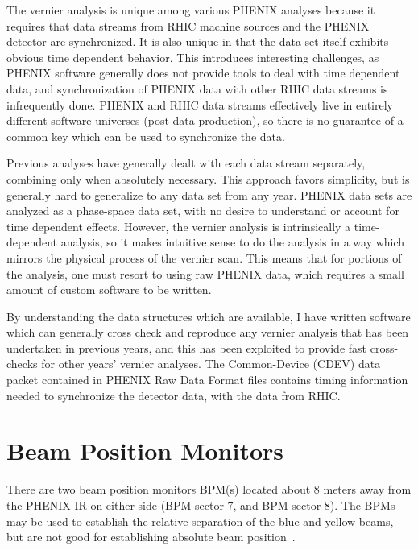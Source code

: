 The vernier analysis is unique among various PHENIX analyses because it requires
that data streams from RHIC machine sources and the PHENIX detector are
synchronized. It is also unique in that the data set itself exhibits obvious time
dependent behavior. This introduces interesting challenges, as PHENIX software
generally does not provide tools to deal with time dependent data, and
synchronization of PHENIX data with other RHIC data streams is infrequently
done. PHENIX and RHIC data streams effectively live in entirely different
software universes (post data production), so there is no guarantee of a common
key which can be used to synchronize the data. 

Previous analyses have generally dealt with each data stream separately,
combining only when absolutely necessary. This approach favors simplicity, but
is generally hard to generalize to any data set from any year. PHENIX data sets
are analyzed as a phase-space data set, with no desire to understand or account
for time dependent effects.  However, the vernier analysis is intrinsically a
time-dependent analysis, so it makes intuitive sense to do the analysis in a way
which mirrors the physical process of the vernier scan. This means that for
portions of the analysis, one must resort to using raw PHENIX data, which
requires a small amount of custom software to be written.

By understanding the data structures which are available, I have written
software which can generally cross check and reproduce any vernier analysis that
has been undertaken in previous years, and this has been exploited to provide
fast cross-checks for other years' vernier analyses. The Common-Device (CDEV)
data packet contained in PHENIX Raw Data Format files contains timing
information needed to synchronize the detector data, with the data from RHIC. 

\section{Beam Position Monitors}
There are two beam position monitors BPM(s) located about 8 meters away from the
PHENIX IR on either side (BPM sector 7, and BPM sector 8). The BPMs may be used
to establish the relative separation of the blue and yellow beams, but are not
good for establishing absolute beam position~\cite{Drees2013}.  

